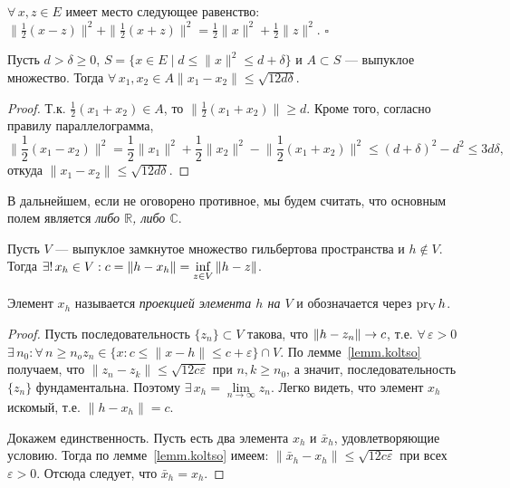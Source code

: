 \documentclass[10pt,titlepage, a4paper]{article}
\begin{document}
\begin{lemm}
$\forall\,x,z\in E$ имеет место следующее равенство: $\|\frac 1
2(x-z)\|^2+\|\frac 1 2(x+z)\|^2= \frac 1 2\|x\|^2+\frac 1 2\|z\|^2$.
\hfill{$\square$}
\end{lemm}

\begin{lemm}\label{lemm.koltso}
Пусть $d>\delta\geqslant 0$, $S=\{x\in E\mid
d\leqslant\|x\|^2\leqslant d+\delta\}$ и $A\subset S$ --- выпуклое
множество. Тогда $\forall\,x_1,x_2\in A$\;\;$\|x_1-x_2\|\leqslant
\sqrt{12d\delta}$.
\end{lemm}

\enlargethispage{\baselineskip}

\begin{proof}
Т.к. $\frac 1 2(x_1+x_2)\in A$, то $\|\frac 1 2(x_1+x_2)\|\geqslant
d$. Кроме того, согласно правилу параллелограмма,
\begin{equation*}
\Big\|\frac 1 2(x_1-x_2)\Big\|^2=\frac 1 2\|x_1\|^2+\frac 1
2\|x_2\|^2-\Big\|\frac 1
2(x_1+x_2)\Big\|^2\leqslant(d+\delta)^2-d^2\leqslant3d\delta,
\end{equation*}
откуда $\|x_1-x_2\|\leqslant\sqrt{12d\delta}$.
\end{proof}

\lecture

\vspace{-27pt}


\begin{zam}
В дальнейшем, если не оговорено противное, мы будем считать, что
основным полем является \emph{либо $\mathbb{R}$, либо $\mathbb{C}$}.
\end{zam}

\begin{predl}
Пусть $V$ --- выпуклое замкнутое множество гильбертова пространства
и $h\not\in V$. Тогда $\exists!\,x_h\in
V:c=\|h-x_h\|\p=\inf\limits_{z\in V}\|h-z\|$.
\end{predl}

\begin{defen}
Элемент $x_h$ называется \emph{проекцией элемента $h$ на $V$} и
обозначается через $\mathop{\mathrm{pr_{V}}}h$.
\end{defen}

\begin{proof}
Пусть последовательность $\{z_n\}\subset V$ такова, что
$\|h\p-z_n\|\to c$, т.е.
$\forall\,\varepsilon>0$\;\;$\exists\,n_0:\forall\,n\geqslant
n_o$\;\;$z_n\in\{x:c\leqslant\|x-h\|\leqslant c+\varepsilon\}\cap
V$. По лемме~\ref{lemm.koltso} получаем, что
$\|z_n-z_k\|\leqslant\sqrt{12c\varepsilon}$ при $n,k\geqslant n_0$,
а значит, последовательность $\{z_n\}$ фундаментальна. Поэтому
$\exists\,x_h=\lim\limits_{n\to\infty}z_n$. Легко видеть, что
элемент $x_h$ искомый, т.е. $\|h-x_h\|=c$.

Докажем единственность. Пусть есть два элемента $x_h$ и $\bar{x}_h$,
удовлетворяющие условию. Тогда по лемме~\ref{lemm.koltso} имеем:
$\|\bar{x}_h-x_h\|\leqslant\sqrt{12c\varepsilon}$ при всех
$\varepsilon>0$. Отсюда следует, что $\bar{x}_h=x_h$.
\end{proof}
\end{document}

